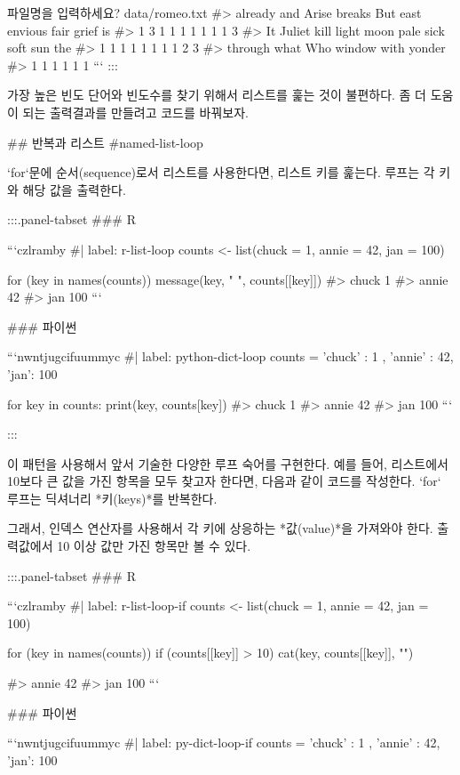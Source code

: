 \documentclass[
  letterpaper,
]{book}
\begin{document}
{파일명을 입력하세요? data/romeo.txt
#> already     and   Arise  breaks     But    east envious    fair   grief      is
#>       1       3       1       1       1       1       1       1       1       3
#>      It  Juliet    kill   light    moon    pale    sick    soft     sun     the
#>       1       1       1       1       1       1       1       1       2       3
#> through    what     Who  window    with  yonder
#>       1       1       1       1       1       1
```
:::



가장 높은 빈도 단어와 빈도수를 찾기 위해서 리스트를 훑는 것이 불편하다. 
좀 더 도움이 되는 출력결과를 만들려고 코드를 바꿔보자.

## 반복과 리스트 {#named-list-loop}

`for`문에 순서(sequence)로서 리스트를 사용한다면, 리스트 키를 훑는다. 
루프는 각 키와 해당 값을 출력한다.

:::{.panel-tabset}
### R 

```czlramby
#| label: r-list-loop
counts <- list(chuck = 1, annie = 42, jan = 100)

for (key in names(counts)) {
    message(key, " ", counts[[key]])
}
#> chuck 1
#> annie 42
#> jan 100
```

### 파이썬

```nwntjugcifuummyc
#| label: python-dict-loop
counts = { 'chuck' : 1 , 'annie' : 42, 'jan': 100}

for key in counts:
  print(key, counts[key])
#> chuck 1
#> annie 42
#> jan 100
```

:::

이 패턴을 사용해서 앞서 기술한 다양한 루프 숙어를 구현한다. 
예를 들어, 리스트에서 10보다 큰 값을 가진 항목을 모두 찾고자 한다면, 다음과 같이 코드를 작성한다. 
`for` 루프는 딕셔너리 *키(keys)*를 반복한다. 

그래서, 인덱스 연산자를 사용해서 각 키에 상응하는 *값(value)*을 가져와야 한다. 
출력값에서 10 이상 값만 가진 항목만 볼 수 있다.

:::{.panel-tabset}
### R 

```czlramby
#| label: r-list-loop-if
counts <- list(chuck = 1, annie = 42, jan = 100)

for (key in names(counts)) {
    if (counts[[key]] > 10) {
        cat(key, counts[[key]], "\n")
    }
}

#> annie 42
#> jan 100
```

### 파이썬

```nwntjugcifuummyc
#| label: py-dict-loop-if
counts = { 'chuck' : 1 , 'annie' : 42, 'jan': 100}

}
\end{document}
